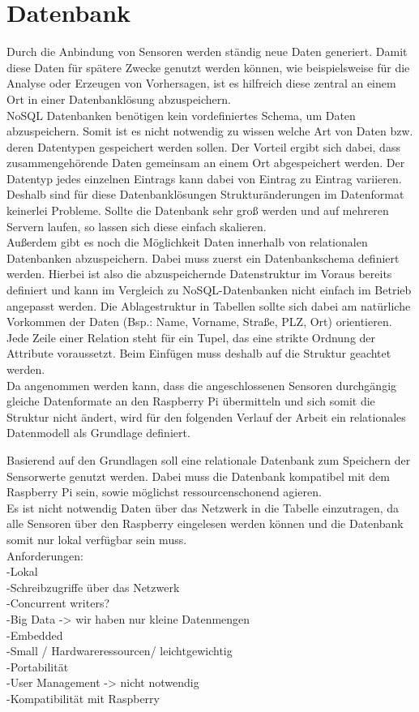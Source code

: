 \section{Datenbank}%
Durch die Anbindung von Sensoren werden ständig neue Daten generiert. Damit diese Daten für spätere Zwecke genutzt werden können, wie beispielsweise für die Analyse oder Erzeugen von Vorhersagen, ist es hilfreich diese zentral an einem Ort in einer Datenbanklösung abzuspeichern.
\\NoSQL Datenbanken benötigen kein vordefiniertes Schema, um Daten abzuspeichern. Somit ist es nicht notwendig zu wissen welche Art von Daten bzw. deren Datentypen gespeichert werden sollen. Der Vorteil ergibt sich dabei, dass zusammengehörende Daten gemeinsam an einem Ort abgespeichert werden. Der Datentyp jedes einzelnen Eintrags kann dabei von Eintrag zu Eintrag variieren. Deshalb sind für diese Datenbanklösungen Strukturänderungen im Datenformat keinerlei Probleme. Sollte die Datenbank sehr groß werden und auf mehreren Servern laufen, so lassen sich diese einfach skalieren\cite{noSQL:noSQL}.
\\Außerdem gibt es noch die Möglichkeit Daten innerhalb von relationalen Datenbanken abzuspeichern. Dabei muss zuerst ein Datenbankschema definiert werden. Hierbei ist also die abzuspeichernde Datenstruktur im Voraus bereits definiert und kann im Vergleich zu NoSQL-Datenbanken nicht einfach im Betrieb angepasst werden. Die Ablagestruktur in Tabellen sollte sich dabei am natürliche Vorkommen der Daten (Bsp.: Name, Vorname, Straße, PLZ, Ort)  orientieren. Jede Zeile einer Relation steht für ein Tupel, das eine strikte Ordnung der Attribute voraussetzt\cite{codd:Codd}. Beim Einfügen muss deshalb auf die Struktur geachtet werden.
\\Da angenommen werden kann, dass die angeschlossenen Sensoren durchgängig gleiche Datenformate an den Raspberry Pi übermitteln und sich somit die Struktur nicht ändert, wird für den folgenden Verlauf der Arbeit ein relationales Datenmodell als Grundlage definiert.


Basierend auf den Grundlagen soll eine relationale Datenbank zum Speichern der Sensorwerte genutzt werden. Dabei muss die Datenbank kompatibel mit dem Raspberry Pi sein, sowie möglichst ressourcenschonend agieren. \\Es ist nicht notwendig Daten über das Netzwerk in die Tabelle einzutragen, da alle Sensoren über den Raspberry eingelesen werden können und die Datenbank somit nur lokal verfügbar sein muss.
\\Anforderungen:\\
-Lokal \\
-Schreibzugriffe über das Netzwerk\\
-Concurrent writers?\\
-Big Data -> wir haben nur kleine Datenmengen\\
-Embedded\\
-Small / Hardwareressourcen/ leichtgewichtig\\
-Portabilität\\
-User Management -> nicht notwendig\\
-Kompatibilität mit Raspberry\\

